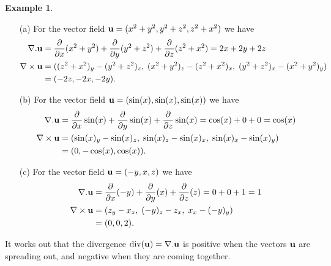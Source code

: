 \documentclass[reqno]{amsart}
\theoremstyle{definition}
\newtheorem{example}[theorem]{Example}
\begin{document}
\begin{example}\ \\
 \begin{itemize}
  \item[(a)] For the vector field $\mathbf{u}=(x^2+y^2,y^2+z^2,z^2+x^2)$ we
   have 
   \begin{align*}
    \nabla.\mathbf{u} &= \frac{\partial}{\partial x}(x^2+y^2) + 
                  \frac{\partial}{\partial y}(y^2+z^2) + 
                  \frac{\partial}{\partial z}(z^2+x^2) 
      = 2x+2y+2z \\
    \nabla\times\mathbf{u} &= 
     ((z^2+x^2)_y-(y^2+z^2)_z,\;
      (x^2+y^2)_z-(z^2+x^2)_x,\;
      (y^2+z^2)_x-(x^2+y^2)_y) \\
     &= (-2z,-2x,-2y). 
   \end{align*}
  \item[(b)] For the vector field $\mathbf{u}=(\sin(x),\sin(x),\sin(x))$
   we have
   \begin{align*}
    \nabla.\mathbf{u} &= \frac{\partial}{\partial x}\sin(x) + 
                  \frac{\partial}{\partial y}\sin(x) + 
                  \frac{\partial}{\partial z}\sin(x) 
      = \cos(x)+0+0 = \cos(x) \\
    \nabla\times\mathbf{u} &= 
     (\sin(x)_y-\sin(x)_z,\;
      \sin(x)_z-\sin(x)_x,\;
      \sin(x)_x-\sin(x)_y) \\
     &= (0,-\cos(x),\cos(x)). 
   \end{align*}
  \item[(c)] For the vector field $\mathbf{u}=(-y,x,z)$ we have
   \begin{align*}
    \nabla.\mathbf{u} &= \frac{\partial}{\partial x}(-y) + 
                  \frac{\partial}{\partial y}(x) + 
                  \frac{\partial}{\partial z}(z) 
      = 0+0+1=1 \\
    \nabla\times\mathbf{u} &= 
     (z_y-x_z,\;
      (-y)_z-z_x,\;
      x_x-(-y)_y) \\
     &= (0,0,2). 
   \end{align*}

 \end{itemize}
\end{example}

It works out that the divergence $\operatorname{div}(\mathbf{u})=\nabla.\mathbf{u}$ is positive
when the vectors $\mathbf{u}$ are spreading out, and negative when they are
coming together.  \\[2ex]
\end{document}
